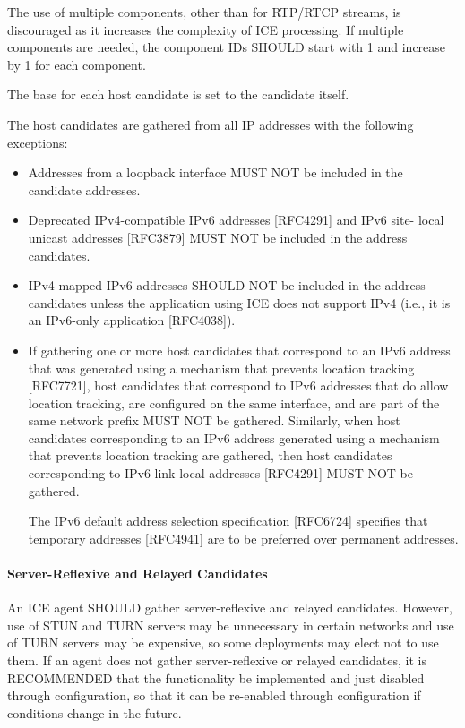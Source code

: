 \documentclass{article}
\begin{document}
The use of multiple components, other than for RTP/RTCP streams, is discouraged as it increases the complexity of ICE processing.  If multiple components are needed, the component IDs SHOULD start with 1 and increase by 1 for each component.

The base for each host candidate is set to the candidate itself.

The host candidates are gathered from all IP addresses with the following exceptions:

\begin{itemize}
\item Addresses from a loopback interface MUST NOT be included in the candidate addresses.
\item Deprecated IPv4-compatible IPv6 addresses [RFC4291] and IPv6 site- local unicast addresses [RFC3879] MUST NOT be included in the address candidates.
\item IPv4-mapped IPv6 addresses SHOULD NOT be included in the address candidates unless the application using ICE does not support IPv4 (i.e., it is an IPv6-only application [RFC4038]).
\item If gathering one or more host candidates that correspond to an IPv6 address that was generated using a mechanism that prevents location tracking [RFC7721], host candidates that correspond to IPv6 addresses that do allow location tracking, are configured on the same interface, and are part of the same network prefix MUST NOT be gathered.  Similarly, when host candidates corresponding to
an IPv6 address generated using a mechanism that prevents location tracking are gathered, then host candidates corresponding to IPv6 link-local addresses [RFC4291] MUST NOT be gathered.

The IPv6 default address selection specification [RFC6724] specifies that temporary addresses [RFC4941] are to be preferred over permanent addresses.

\end{itemize}
\paragraph{Server-Reflexive and Relayed Candidates}

An ICE agent SHOULD gather server-reflexive and relayed candidates. However, use of STUN and TURN servers may be unnecessary in certain networks and use of TURN servers may be expensive, so some deployments may elect not to use them.  If an agent does not gather server-reflexive or relayed candidates, it is RECOMMENDED that the functionality be implemented and just disabled through configuration, so that it can be re-enabled through configuration if conditions change in the future.
\end{document}
